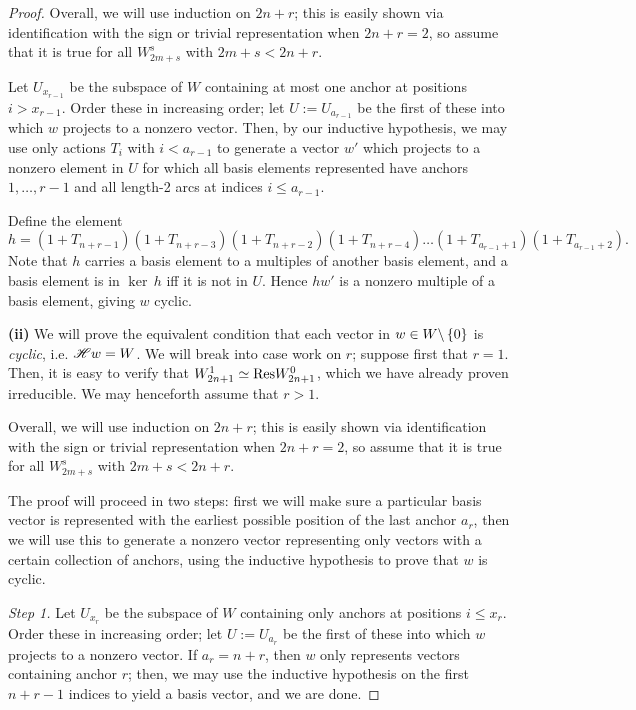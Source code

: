\documentclass{amsart}
\begin{document}
\begin{proof}
  Overall, we will use induction on $2n + r$;
  this is easily shown via identification with the sign or trivial representation when $2n + r = 2$, so assume that it is true for all $W_{2m + s}^s$ with $2m + s < 2n + r$.

  Let $U_{x_{r-1}}$ be the subspace of $W$ containing at most one anchor at positions $i > x_{r-1}$.
  Order these in increasing order;
  let $U := U_{a_{r-1}}$ be the first of these into which $w$ projects to a nonzero vector.
  Then, by our inductive hypothesis, we may use only actions $T_i$ with $i < a_{r-1}$ to generate a vector $w'$ which projects to a nonzero element in $U$ for which all basis elements represented have anchors $1,\dots,r-1$ and all length-2 arcs at indices $i \leq a_{r-1}$.

  Define the element
  \[
    h = (1 + T_{n + r - 1})(1 + T_{n+r-3})(1 + T_{n+r-2})(1 + T_{n + r - 4})\dots(1 + T_{a_{r-1} +1})(1 + T_{a_{r-1}+2}).
  \]
  Note that $h$ carries a basis element to a multiples of another basis element, and a basis element is in $\ker \, h$ iff it is not in $U$.
  Hence $hw'$ is a nonzero multiple of a basis element, giving $w$ cyclic.

  \vspace{\sectionsep}
  \textbf{(ii)}
  We will prove the equivalent condition that each vector in $w \in W\backslash \left\{ 0 \right\}$ is \emph{cyclic}, i.e. $\mathscr{H} w = W$.
  We will break into case work on $r$;
  suppose first that $r = 1$.
  Then, it is easy to verify that $W_{2n + 1}^1 \simeq \text{Res} W_{2n + 1}^0$, which we have already proven irreducible.
  We may henceforth assume that $r > 1$.
  
  Overall, we will use induction on $2n + r$;
  this is easily shown via identification with the sign or trivial representation when $2n + r = 2$, so assume that it is true for all $W_{2m + s}^s$ with $2m + s < 2n + r$.
  
  The proof will proceed in two steps: first we will make sure a particular basis vector is represented with the earliest possible position of the last anchor $a_r$, then we will use this to generate a nonzero vector representing only vectors with a certain collection of anchors, using the inductive hypothesis to prove that $w$ is cyclic.
  
  \vspace{\sectionsep}
  \textit{Step 1.}
  Let $U_{x_r}$ be the subspace of $W$ containing only anchors at positions $i \leq x_r$.
  Order these in increasing order;
  let $U := U_{a_r}$ be the first of these into which $w$ projects to a nonzero vector.
  If $a_r = n + r$, then $w$ only represents vectors containing anchor $r$;
  then, we may use the inductive hypothesis on the first $n + r - 1$ indices to yield a basis vector, and we are done.


\end{proof}
\end{document}
